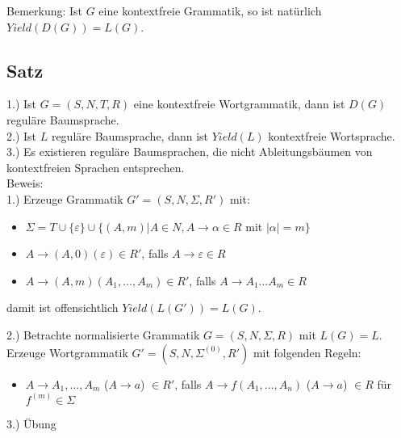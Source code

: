 \documentclass[titlepage]{article}
\begin{document}
Bemerkung: Ist $G$ eine kontextfreie Grammatik, so ist nat\"urlich $Yield(D(G)) = L(G)$.

\subsection{Satz}

1.) Ist $G = (S,N,T,R)$ eine kontextfreie Wortgrammatik, dann ist $D(G)$ regul\"are Baumsprache.\\
2.) Ist $L$ regul\"are Baumsprache, dann ist $Yield(L)$ kontextfreie Wortsprache.\\
3.) Es existieren regul\"are Baumsprachen, die nicht Ableitungsb\"aumen von kontextfreien Sprachen entsprechen.\\

Beweis:\\
1.) Erzeuge Grammatik $G' = (S,N,\Sigma,R')$ mit:\\
\begin{itemize}
	\item $\Sigma = T \cup \{\varepsilon\} \cup \{ (A,m) | A \in N, A \to \alpha \in R$ mit $|\alpha| = m \}$
	\item $A \to (A,0) (\varepsilon) \in R'$, falls $A \to \varepsilon \in R$
	\item $A \to (A,m) (A_1, \dots, A_m) \in R'$, falls $A \to A_1 \dots A_m \in R$
\end{itemize}
damit ist offensichtlich $Yield(L(G')) = L(G)$.

2.) Betrachte normalisierte Grammatik $G = (S,N,\Sigma,R)$ mit $L(G) = L$.\\
	Erzeuge Wortgrammatik $G' = (S,N,\Sigma^{(0)},R')$ mit folgenden Regeln:
\begin{itemize}
	\item $A \to A_1, \dots, A_m$ ($A \to a$) $\in R'$, falls $A \to f(A_1, \dots, A_n)$ ($A \to a$) $\in R$ f\"ur $f^{(m)} \in \Sigma$
\end{itemize}

3.) \"Ubung
\end{document}

